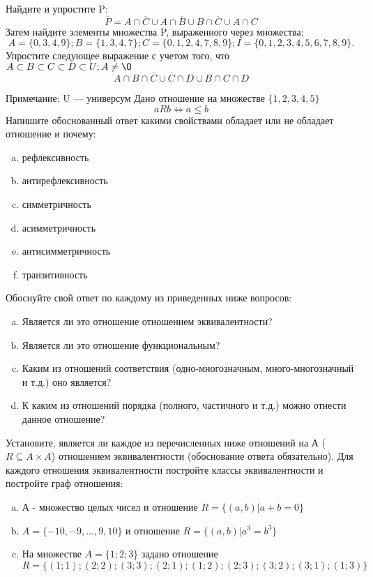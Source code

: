 \documentclass[10pt]{exam}
\begin{document}
\begin{questions}
\question
Найдите и упростите P:
\begin{equation*}
\overline{P} = A \cap \overline{C} \cup A \cap \overline{B} \cup B \cap \overline{C} \cup A \cap C
\end{equation*}
Затем найдите элементы множества P, выраженного через множества:
\begin{equation*}
A = \{0, 3, 4, 9\}; 
B = \{1, 3, 4, 7\};
C = \{0, 1, 2, 4, 7, 8, 9\};
I = \{0, 1, 2, 3, 4, 5, 6, 7, 8, 9\}.
\end{equation*}\question
Упростите следующее выражение с учетом того, что $A\subset B \subset C \subset D \subset U; A \neq \O$
\begin{equation*}
A \cap B  \cap \overline{C} \cup \overline{C} \cap D \cup B \cap C \cap D
\end{equation*}

Примечание: U — универсум\question
Дано отношение на множестве $\{1, 2, 3, 4, 5\}$ 
\begin{equation*}
aRb \iff a \leq b
\end{equation*}
Напишите обоснованный ответ какими свойствами обладает или не обладает отношение и почему:   
\begin{enumerate} [a)]\setcounter{enumi}{0}
\item рефлексивность
\item антирефлексивность
\item симметричность
\item асимметричность
\item антисимметричность
\item транзитивность
\end{enumerate}

Обоснуйте свой ответ по каждому из приведенных ниже вопросов:
\begin{enumerate} [a)]\setcounter{enumi}{0}
    \item Является ли это отношение отношением эквивалентности?
    \item Является ли это отношение функциональным?
    \item Каким из отношений соответствия (одно-многозначным, много-многозначный и т.д.) оно является?
    \item К каким из отношений порядка (полного, частичного и т.д.) можно отнести данное отношение?
\end{enumerate}


\question
Установите, является ли каждое из перечисленных ниже отношений на А ($R \subseteq A \times A$) отношением эквивалентности (обоснование ответа обязательно). Для каждого отношения эквивалентности 
постройте классы эквивалентности и постройте граф отношения:
\begin{enumerate}[a)]\setcounter{enumi}{0}
\item А - множество целых чисел и отношение $R = \{(a,b)|a + b = 0\}$
\item $A = \{-10, -9, …, 9, 10\}$ и отношение $R = \{(a,b)|a^{3} = b^{3}\}$
\item На множестве $A = \{1; 2; 3\}$ задано отношение $R = \{(1; 1); (2; 2); (3; 3); (2; 1); (1; 2); (2; 3); (3; 2); (3; 1); (1; 3)\}$


\end{enumerate}
\end{questions}
\end{document}
